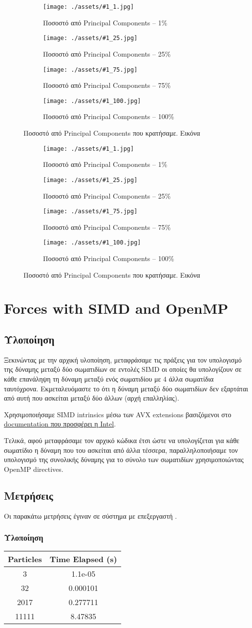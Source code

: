 \documentclass[11pt]{scrartcl} %
\newcommand{\showpcaimage}[1]{
    \begin{figure}[H]
        \centering
        \begin{subfigure}[b]{0.45\textwidth}
            \texttt{[image: ./assets/\#1\_1.jpg]}
            \caption{Ποσοστό από Principal Components -- 1\%}
        \end{subfigure}
        \begin{subfigure}[b]{0.45\textwidth}
            \texttt{[image: ./assets/\#1\_25.jpg]}
            \caption{Ποσοστό από Principal Components -- 25\%}
        \end{subfigure}
        \begin{subfigure}[b]{0.45\textwidth}
            \texttt{[image: ./assets/\#1\_75.jpg]}
            \caption{Ποσοστό από Principal Components -- 75\%}
        \end{subfigure}
        \begin{subfigure}[b]{0.45\textwidth}
            \texttt{[image: ./assets/\#1\_100.jpg]}
            \caption{Ποσοστό από Principal Components -- 100\%}
        \end{subfigure}
        \caption{Ποσοστό από Principal Components που κρατήσαμε. Εικόνα \src{#1}}
    \end{figure}
}
\begin{document}
\showpcaimage{elvis}
\showpcaimage{cyclone}

\section{Forces with SIMD and OpenMP}

\subsection{Υλοποίηση}

Ξεκινώντας με την αρχική υλοποίηση, μεταφράσαμε τις πράξεις για τον υπολογισμό της δύναμης μεταξύ δύο σωματιδίων σε εντολές SIMD 
οι οποίες θα υπολογίζουν σε κάθε επανάληψη τη δύναμη μεταξύ ενός σωματιδίου με 4 άλλα σωματίδια ταυτόχρονα. 
Εκμεταλευόμαστε το ότι η δύναμη μεταξύ δύο σωματιδίων δεν εξαρτάται από αυτή που ασκείται μεταξύ δύο άλλων (αρχή επαλληλίας).

Χρησιμοποιήσαμε SIMD intrinsics μέσω των AVX extensions βασιζόμενοι στο \href{https://www.intel.com/content/www/us/en/docs/intrinsics-guide/index.html#text=mm256_loadu_pd&ig_expand=4488&techs=AVX_ALL}{documentation που προσφέρει η Intel}.

Τελικά, αφού μεταφράσαμε τον αρχικό κώδικα έτσι ώστε να υπολογίζεται για κάθε σωματίδιο η δύναμη που του ασκείται
από άλλα τέσσερα, παραλληλοποιήσαμε τον υπολογισμό της συνολικής δύναμης για το σύνολο των σωματιδίων χρησιμοποιώντας 
OpenMP directives.

\subsection{Μετρήσεις}

Οι παρακάτω μετρήσεις έγιναν σε σύστημα με επεξεργαστή .

\subsubsection{ Υλοποίηση}

\begin{table}[H]
    \centering
    \begin{tabular}{|c|c|}
    \hline
        \textbf{Particles} & \textbf{Time Elapsed (s)} \\ \hline
        3     & 1.1e-05  \\ \hline 
        32    & 0.000101 \\ \hline
        2017  & 0.277711 \\ \hline
        11111 & 8.47835  \\ \hline
    \end{tabular}
\end{table}
\end{document}
